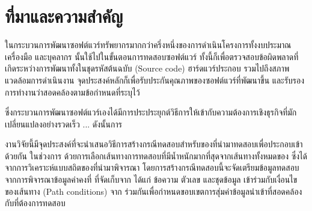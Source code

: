 \section{ที่มาและความสำคัญ} 

ในกระบวนการพัฒนาซอฟต์แวร์ทรัพยากรมากกว่าครึ่งหนึ่งของการดำเนินโครงการทั้งงบประมาณ เครื่องมือ และบุคลากร นั้นใช้ไปในขั้นตอนการทดสอบซอฟต์แวร์ %
ทั้งนี้ก็เพื่อตรวจสอบข้อผิดพลาดที่เกิดระหว่างการพัฒนาทั้งในชุดรหัสต้นฉบับ (Source code) ฮาร์ดแวร์ประกอบ รวมไปถึงสภาพแวดล้อมการดำเนินงาน 
จุดประสงค์หลักก็เพื่อรับประกันคุณภาพของซอฟต์แวร์ที่พัฒนาขึ้น และรับรองการทำงานว่าสอดคล้องตามข้อกำหนดที่ระบุไว้

ซึ่งกระบวนการพัฒนาซอฟต์แวร์เองได้มีการประประยุกต์วิธีการให้เข้ากับความต้องการเชิงธุรกิจที่มักเปลี่ยนแปลงอย่างรวดเร็ว ... ดังนั้นการ







งานวิจัยนี้มีจุดประสงค์ที่จะนำเสนอวิธีการสร้างกรณีทดสอบสำหรับ{\sourcecode}ของ{\softwareComponent}ที่นำมาทดสอบเพื่อประกอบเข้าด้วยกัน
ในช่วงการ{\IntegrationTesting} ด้วยการเลือกเส้นทางการทดสอบที่มีน้ำหนักมากที่สุดจากเส้นทางทั้งหมดของ{\scg} 
ซึ่งได้จากการวิเคราะห์แบบสถิตของ{\sourcecode}ที่นำมาพิจารณา โดยการสร้างกรณีทดสอบนี้จะจัดเตรียมข้อมูลทดสอบจากการพิจารณาข้อมูลค่าคงที่
ที่จัดเก็บจาก{\sourcecode} ได้แก่ ข้อความ ตัวเลข และชุดข้อมูล เข้าร่วมกับเงื่อนไขของเส้นทาง (Path conditions) จาก{\cfg} 
ร่วมกันเพื่อกำหนดขอบเขตการสุ่มค่าข้อมูลนำเข้าที่สอดคล้องกับ{\MethodSignature}ที่ต้องการทดสอบ

